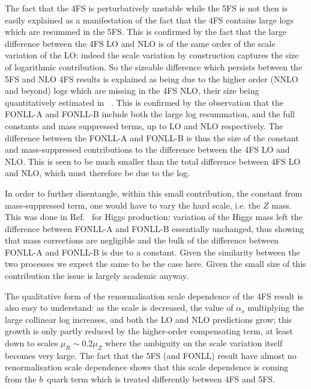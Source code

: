 \documentclass[12pt]{article}
\begin{document}
The fact that the 4FS is perturbatively unstable while the 5FS is not
then is easily explained as a manifestation of the fact that the 4FS
contains large logs which are resummed in the 5FS. This is confirmed
by the fact that the large difference between the 4FS LO and NLO is of
the same order of the scale variation of the LO: indeed the scale
variation by construction captures the size of logarithmic
contribution. So the sizeable difference which persists between the 5FS
and NLO 4FS results is explained as being due to the higher order
(NNLO and beyond) logs
which are missing in the 4FS NLO, their size being quantitatively estimated
in ~\cite{Lim:2016wjo}. This is  confirmed by the observation
that the FONLL-A and FONLL-B include both the large log resummation,
and the full constants and mass suppressed terms, up to LO and NLO
respectively. The difference  between the FONLL-A and FONLL-B is thus
the size of the constant and mass-suppressed contributions to the
difference between the 4FS LO and NLO. This is seen to be much smaller
than the total difference between 4FS LO and NLO, which must therefore
be due to the log.

In order to further disentangle, within this small contribution, 
the constant from mass-suppressed term,
one would have to vary the hard scale, i.e. the $Z$ mass. This was
done in Ref.~\cite{Forte:2016sja} for Higgs production: variation of
the Higgs mass left the difference between FONLL-A and FONLL-B
essentially unchanged, thus showing that mass corrections are
negligible and the bulk of the difference between FONLL-A and FONLL-B
is due to a constant. Given the similarity between the two processes
we expect the same to be the case here. Given the small size of this
contribution the issue is largely academic anyway.

The qualitative form of the renormalisation scale dependence of the 4FS
result is also easy to understand: as the scale is decreased, the
value of $\alpha_s$ multiplying the large collinear log increases, and
both the LO and NLO predictions grow; this growth is only partly
reduced by the higher-order compensating term, at least down to
scales $\mu_R\sim 0.2\mu_Z$ where the ambiguity on the scale variation
itself becomes very large. The fact  that the 5FS (and FONLL) result
have almost no renormalisation scale dependence shows that this scale
dependence is coming from the $b$~quark term which is treated differently
between 4FS and 5FS.
\end{document}
